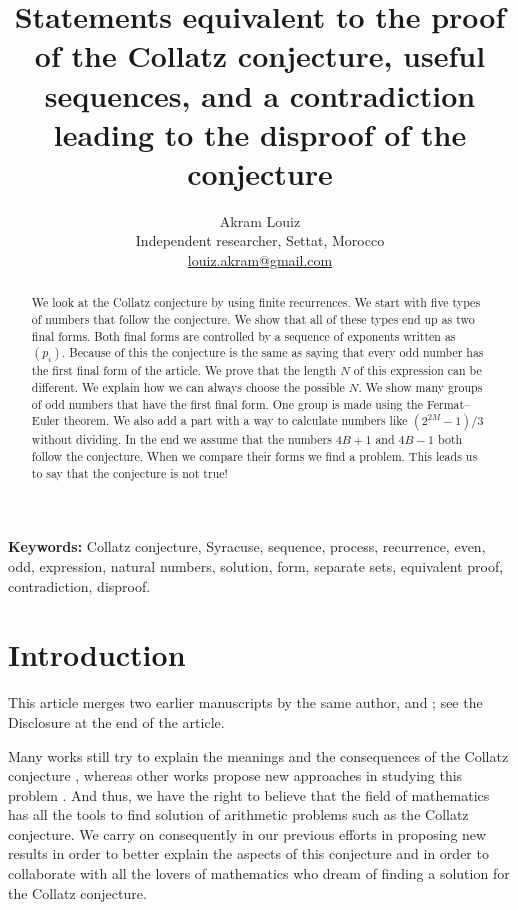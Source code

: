 \documentclass[11pt,a4paper]{article}
\title{\textbf{Statements equivalent to the proof of the Collatz conjecture, useful sequences, and a contradiction leading to the disproof of the conjecture}}
\author{Akram Louiz\\[2pt]
\small Independent researcher, Settat, Morocco\\
\small \href{mailto:louiz.akram@gmail.com}{louiz.akram@gmail.com}}
\date{}
\theoremstyle{definition}
\begin{document}
\maketitle

\begin{abstract}
We look at the Collatz conjecture by using finite recurrences. We start with five types of numbers that follow the conjecture. We show that all of these types end up as two final forms. Both final forms are controlled by a sequence of exponents written as $(p_i)$. Because of this the conjecture is the same as saying that every odd number has the first final form of the article. We prove that the length $N$ of this expression can be different. We explain how we can always choose the possible $N$. We show many groups of odd numbers that have the first final form. One group is made using the Fermat--Euler theorem. We also add a part with a way to calculate numbers like $(2^{2M}-1)/3$ without dividing. In the end we assume that the numbers $4B+1$ and $4B-1$ both follow the conjecture. When we compare their forms we find a problem. This leads us to say that the conjecture is not true!
\end{abstract}

\noindent\textbf{Keywords:} Collatz conjecture, Syracuse, sequence, process, recurrence,
even, odd, expression, natural numbers, solution, form, separate sets, equivalent proof,
contradiction, disproof.

\section{Introduction}
This article merges two earlier manuscripts by the same author,
\citet{LouizEquivalent} and \citet{LouizLetter}; see the Disclosure at the end of the article.

Many works still try to explain the meanings and the consequences of the Collatz conjecture
\citep{AndreiMasalagiu}, whereas other works propose new approaches in studying this problem
\citep{Ren}. And thus, we have the right to believe that the field of mathematics has all the
tools to find solution of arithmetic problems such as the Collatz conjecture. We carry on
consequently in our previous efforts in proposing new results \citep{Louiz2024} in order to
better explain the aspects of this conjecture and in order to collaborate with all the lovers
of mathematics who dream of finding a solution for the Collatz conjecture.
\end{document}
